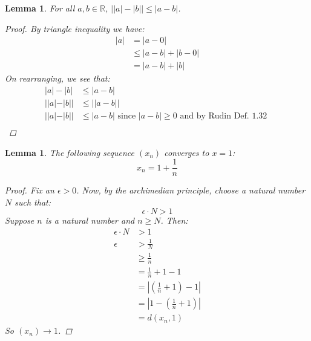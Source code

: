 \documentclass{amsart}
\newtheorem{lemma}[theorem]{Lemma}
\begin{document}
\begin{lemma}
    For all $a,b\in\mathbb{R}$, $\left| |a| - |b| \right| \leq |a - b|$.
    \begin{proof}
        By triangle inequality we have:
        \begin{align*}
            |a| &= |a - 0| \\
            &\leq |a - b| + |b - 0| \\
            &= |a - b| + |b| 
        \end{align*}
        On rearranging, we see that:
        \begin{align*}
            |a| - |b| &\leq |a - b| \\
            ||a| - |b|| &\leq ||a - b|| \\
            ||a| - |b|| &\leq |a - b| \text{ since } |a - b| \geq 0
            \text{ and by Rudin Def. 1.32 }\\
        \end{align*}
    \end{proof}
\end{lemma}
\begin{lemma} 
    The following sequence $(x_n)$ converges to $x = 1$:
    \[
        x_n = 1 + \frac{1}{n}    
    \]
    \begin{proof}
        Fix an $\epsilon > 0$. Now, by the archimedian principle, choose a natural number $N$ such that:
        \[
            \epsilon\cdot N > 1    
        \]
        Suppose $n$ is a natural number and $n \geq N$. Then:
        \begin{align*}
            \epsilon\cdot N &> 1 \\
            \epsilon &> \frac{1}{N} \\
            &\geq \frac{1}{n} \\
            &= \frac{1}{n} + 1 - 1 \\
            &= \left| \left(\frac{1}{n} + 1\right) - 1 \right| \\
            &= \left| 1 - \left(\frac{1}{n} + 1\right) \right| \\
            &= d(x_n, 1)
        \end{align*}
        So $(x_n) \to 1$.
    \end{proof}
\end{lemma}
\end{document}
